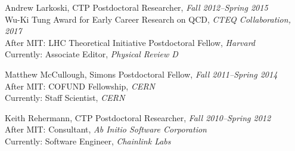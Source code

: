 \item Andrew Larkoski, CTP Postdoctoral Researcher, \emph{Fall 2012--Spring 2015}
\\ Wu-Ki Tung Award for Early Career Research on QCD, \emph{CTEQ Collaboration, 2017}
\\ After MIT: LHC Theoretical Initiative Postdoctoral Fellow, \emph{Harvard}
\\ Currently: Associate Editor, \emph{Physical Review D}

\item Matthew McCullough, Simons Postdoctoral Fellow, \emph{Fall 2011--Spring 2014}
\\ After MIT: COFUND Fellowship, \emph{CERN}
\\ Currently: Staff Scientist, \emph{CERN}

\item Keith Rehermann, CTP Postdoctoral Researcher, \emph{Fall 2010--Spring 2012}
\\ After MIT: Consultant, \emph{Ab Initio Software Corporation}
\\ Currently: Software Engineer, \emph{Chainlink Labs}

\el
